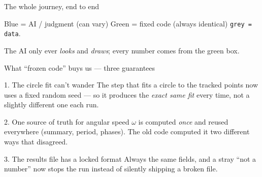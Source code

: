 \documentclass[10pt,aspectratio=169]{beamer}
\newcommand{\gd}[1]{\textcolor{good}{#1}}
\newcommand{\bd}[1]{\textcolor{bad}{#1}}
\begin{document}
\begin{frame}{The whole journey, end to end}
\centering
{}
\par\vspace{0.6em}
\footnotesize \textcolor{llmblue}{Blue = AI / judgment (can vary)} \qquad \gd{Green = fixed code (always identical)} \qquad \texttt{grey = data}.
\par The AI only ever \emph{looks} and \emph{draws}; every number comes from the green box.
\end{frame}

\begin{frame}{What ``frozen code'' buys us --- three guarantees}
\begin{block}{1. The circle fit can't wander}
The step that fits a circle to the tracked points now uses a fixed random seed --- so it produces the \emph{exact same fit} every time, not a slightly different one each run.
\end{block}
\begin{block}{2. One source of truth for angular speed}
$\omega$ is computed \emph{once} and reused everywhere (summary, period, phases). The old code computed it two different ways that disagreed.
\end{block}
\begin{block}{3. The results file has a locked format}
Always the same fields, and a stray ``not a number'' now \bd{stops the run} instead of silently shipping a broken file.
\end{block}
\end{frame}
\end{document}
